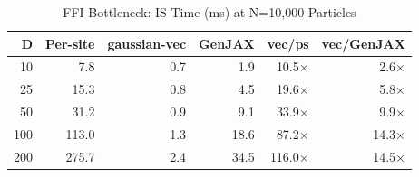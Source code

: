 \begin{table}[t]
\centering
\caption{FFI Bottleneck: IS Time (ms) at N=10,000 Particles}
\label{tab:ffi}
\small
\begin{tabular}{rrrrrr}
\toprule
D & Per-site & gaussian-vec & GenJAX & vec/ps & vec/GenJAX \\
\midrule
10 & 7.8 & 0.7 & 1.9 & 10.5$\times$ & 2.6$\times$ \\
25 & 15.3 & 0.8 & 4.5 & 19.6$\times$ & 5.8$\times$ \\
50 & 31.2 & 0.9 & 9.1 & 33.9$\times$ & 9.9$\times$ \\
100 & 113.0 & 1.3 & 18.6 & 87.2$\times$ & 14.3$\times$ \\
200 & 275.7 & 2.4 & 34.5 & 116.0$\times$ & 14.5$\times$ \\
\bottomrule
\end{tabular}
\end{table}